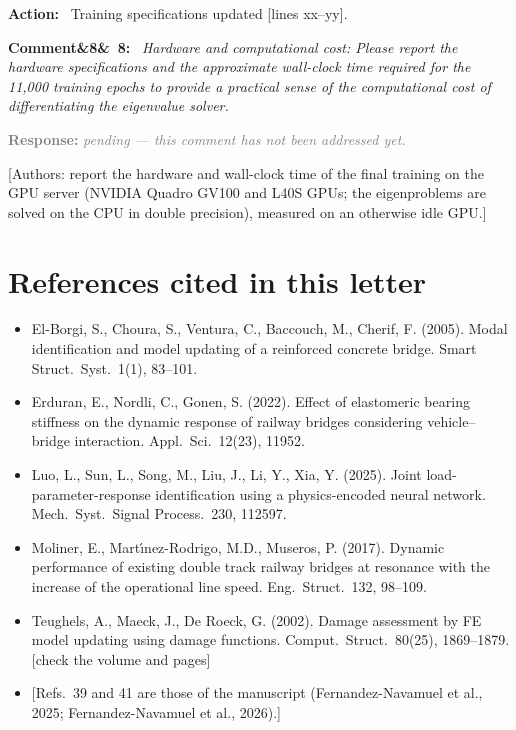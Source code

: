 \documentclass[11pt]{article}
\newenvironment{rcomment}[1]{\par\bigskip\noindent\textbf{Comment\ifx&#1&\else\ #1\fi:}\ \itshape}{\par}
\newenvironment{action}{\par\smallskip\noindent\color{resp}\textbf{Action:}\ }{\par}
\newcommand{\pending}{\par\smallskip\noindent\textcolor{gray}{\textbf{Response:} \textit{pending --- this comment
has not been addressed yet.}}\par}
\newcommand{\authornote}[1]{\textcolor{note}{\textsf{[Authors: #1]}}}
\newcommand{\tbd}[1]{\textcolor{note}{\textsf{[#1]}}}
\newcommand{\lines}[1]{\tbd{lines #1}}
\begin{document}
\begin{action}
Training specifications updated \lines{xx--yy}.
\end{action}

\begin{rcomment}{8}
Hardware and computational cost: Please report the hardware specifications and the approximate wall-clock time
required for the 11,000 training epochs to provide a practical sense of the computational cost of differentiating the
eigenvalue solver.
\end{rcomment}
\pending
\authornote{report the hardware and wall-clock time of the final training on the GPU server (NVIDIA Quadro GV100 and L40S GPUs; the eigenproblems are solved on the CPU in double precision), measured on an otherwise idle GPU.}

\section{References cited in this letter}
{\small
\begin{itemize}[leftmargin=*,label={}]
\item El-Borgi, S., Choura, S., Ventura, C., Baccouch, M., Cherif, F. (2005). Modal identification and model updating of a reinforced concrete bridge. Smart Struct.\ Syst.\ 1(1), 83--101.
\item Erduran, E., Nordli, C., Gonen, S. (2022). Effect of elastomeric bearing stiffness on the dynamic response of railway bridges considering vehicle--bridge interaction. Appl.\ Sci.\ 12(23), 11952.
\item Luo, L., Sun, L., Song, M., Liu, J., Li, Y., Xia, Y. (2025). Joint load-parameter-response identification using a physics-encoded neural network. Mech.\ Syst.\ Signal Process.\ 230, 112597.
\item Moliner, E., Mart\'{\i}nez-Rodrigo, M.D., Museros, P. (2017). Dynamic performance of existing double track railway bridges at resonance with the increase of the operational line speed. Eng.\ Struct.\ 132, 98--109.
\item Teughels, A., Maeck, J., De Roeck, G. (2002). Damage assessment by FE model updating using damage functions. Comput.\ Struct.\ 80(25), 1869--1879. \tbd{check the volume and pages}
\item \tbd{Refs.~39 and 41 are those of the manuscript (Fernandez-Navamuel et al., 2025; Fernandez-Navamuel et al., 2026).}
\end{itemize}
}
\end{document}
